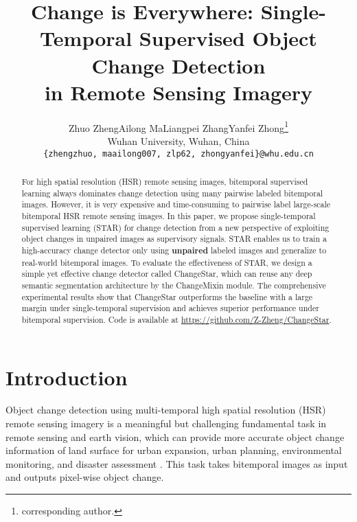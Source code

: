 \documentclass[10pt,twocolumn,letterpaper]{article}
\begin{document}
\title{Change is Everywhere: Single-Temporal Supervised Object Change Detection \\ in Remote Sensing Imagery}

\author{Zhuo Zheng\qquad Ailong Ma\qquad Liangpei Zhang\qquad Yanfei Zhong\thanks{corresponding author.} \\
Wuhan University, Wuhan, China\\
{\tt\small \{zhengzhuo, maailong007, zlp62, zhongyanfei\}@whu.edu.cn}
}

\maketitle
\ificcvfinal\thispagestyle{empty}\fi

\begin{abstract}
For high spatial resolution (HSR) remote sensing images, bitemporal supervised learning always dominates change detection using many pairwise labeled bitemporal images.
However, it is very expensive and time-consuming to pairwise label large-scale bitemporal HSR remote sensing images.
In this paper, we propose single-temporal supervised learning (STAR) for change detection from a new perspective of exploiting object changes in unpaired images as supervisory signals.
STAR enables us to train a high-accuracy change detector only using \textbf{unpaired} labeled images and generalize to real-world bitemporal images.
To evaluate the effectiveness of STAR, we design a simple yet effective change detector called ChangeStar, which can reuse any deep semantic segmentation architecture by the ChangeMixin module.
The comprehensive experimental results show that ChangeStar outperforms the baseline with a large margin under single-temporal supervision and achieves superior performance under bitemporal supervision.
Code is available at \url{https://github.com/Z-Zheng/ChangeStar}.

\end{abstract}


\vspace{-0.1in}
\section{Introduction}
\label{sec:intro}
Object change detection using multi-temporal high spatial resolution (HSR) remote sensing imagery is a meaningful but challenging fundamental task in remote sensing and earth vision, which can provide more accurate object change information of land surface for urban expansion, urban planning, environmental monitoring, and disaster assessment \cite{hussain2013change, zhang2017separate, daudt2018urban, mahdavi2019polsar, gupta2019creating}.
This task takes bitemporal images as input and outputs pixel-wise object change.
\end{document}
